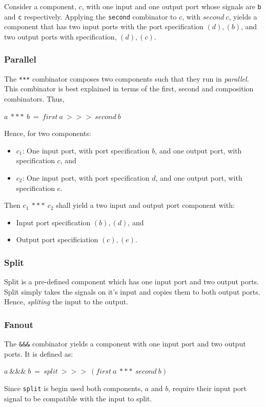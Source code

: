 Consider a component, $c$, with one input and one output port whose signals are \texttt{b} and \texttt{c} respectively. Applying the \texttt{second} combinator to $c$, with $second\ c$, yields a component that has two input ports with the port specification $(d), (b)$, and two output ports with specification, $(d), (c)$.

\subsubsection{Parallel}
The \texttt{***} combinator composes two components such that they run in \emph{parallel}. This combinator is best explained in terms of the first, second and composition combinators. Thus,
\begin{center}
$a\ ***\ b\ =\ first\ a\ >>>\ second\ b$
\end{center}
Hence, for two components:
\begin{itemize}
\item $c_1$: One input port, with port specification $b$, and one output port, with specification $c$, and
\item $c_2$: One input port, with port specification $d$, and one output port, with specification $e$.
\end{itemize}
Then $c_1\ ***\ c_2$ shall yield a two input and output port component with:
\begin{itemize}
\item Input port specification $(b), (d)$, and
\item Output port specificiation $(c), (e)$.
\end{itemize}

\subsubsection{Split}
Split is a pre-defined component which has one input port and two output ports. Split simply takes the signals on it's input and copies them to both output ports. Hence, \emph{spliting} the input to the output.

\subsubsection{Fanout}
The \texttt{\&\&\&} combinator yields a component with one input port and two output ports. It is defined as:
\begin{center}
$a\ \&\&\&\ b\ =\ split\ >>>\ (first\ a\ ***\ second\ b)$
\end{center}
Since \texttt{split} is begin used both components, $a$ and $b$, require their input port signal to be compatible with the input to split.

